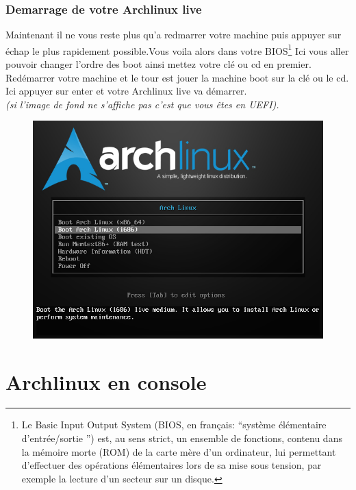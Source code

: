 \documentclass[a4paper]{book}
\begin{document}
  \section{Demarrage de votre Archlinux live}
  Maintenant il ne vous reste plus qu'a redmarrer votre machine puis appuyer
  sur \'echap le plus rapidement possible.Vous voila alors dans votre
  BIOS\footnote{Le Basic Input Output System (BIOS, en français:
    ``système élémentaire d'entrée/sortie '') est, au sens strict, un ensemble de
    fonctions, contenu dans la mémoire morte (ROM) de la carte mère d'un
    ordinateur, lui permettant d'effectuer des opérations élémentaires lors de sa
  mise sous tension, par exemple la lecture d'un secteur sur un disque.}
  Ici vous aller pouvoir changer l'ordre des boot ainsi mettez votre cl\'e ou
  cd en premier.\\
  Red\'emarrer votre machine et le tour est jouer la machine boot sur la cl\'e ou
  le cd.
  Ici appuyer sur enter et votre Archlinux live va d\'emarrer.\\
  {\itshape(si l'image de fond ne s'affiche pas c'est que vous êtes en UEFI).}
  \begin{figure}[h]
    \includegraphics[width=\textwidth]{images/usb_boot}
  \end{figure}
  \part{Archlinux en console}
\end{document}
